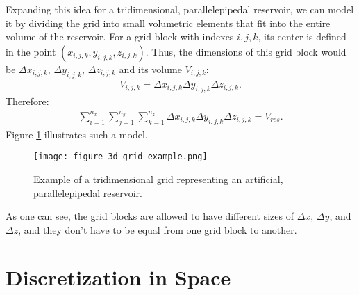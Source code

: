 %
Expanding this idea for a tridimensional, parallelepipedal reservoir, we can model it by dividing the grid into small volumetric elements that fit into the entire volume of the reservoir.
%
For a grid block with indexes $i,j,k$, its center is defined in the point $(x_{i,j,k},y_{i,j,k},z_{i,j,k})$.
%
Thus, the dimensions of this grid block would be $\Delta x_{i,j,k}$, $\Delta y_{i,j,k}$, $\Delta z_{i,j,k}$ and its volume $V_{i,j,k}$:
%
\begin{align}
	\label{equation-grid-block-volume}
	V_{i,j,k} = \Delta x_{i,j,k} \Delta y_{i,j,k} \Delta z_{i,j,k}.
\end{align}
%
Therefore:
%
%
\begin{align}
	\label{equation-reservoir-volume}
	\sum_{i=1}^{n_x}\sum_{j=1}^{n_y}\sum_{k=1}^{n_z}\Delta x_{i,j,k} \Delta y_{i,j,k}\Delta z_{i,j,k}=V_{res}.
\end{align}
%
Figure \ref{figure-3d-grid-example} illustrates such a model.
%
\begin{figure}[h]
	\centering
	\texttt{[image: figure-3d-grid-example.png]}\\
	\caption{Example of a tridimensional grid representing an artificial, parallelepipedal reservoir.}
	\label{figure-3d-grid-example}
\end{figure}
%
\noindent
As one can see, the grid blocks are allowed to have different sizes of $\Delta x$, $\Delta y$, and $\Delta z$, and they don't have to be equal from one grid block to another.

\section{Discretization in Space}

